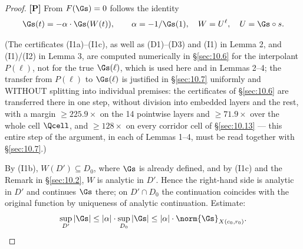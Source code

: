 \begin{proof}
\textbf{[P]} From $F(\Gs) = 0$ follows the identity
\[
\Gs(t) = -\alpha \cdot \Gs(W(t)) , \qquad \alpha = -1/\Gs(1), \quad W = U^\ell, \quad U = \Gs\circ s .
\]

(The certificates (I1a)--(I1c), as well as (D1)--(D3) and (I1) in Lemma 2, and
(I1)/(I2) in Lemma 3, are computed numerically in \S\ref{sec:10.6} for the
interpolant $P(\ell)$, not for the true $\Gs(\ell)$, which is used here and
in Lemmas 2--4; the transfer from $P(\ell)$ to $\Gs(\ell)$ is justified in
\S\ref{sec:10.7} uniformly and WITHOUT splitting into individual premises: the
certificates of \S\ref{sec:10.6} are transferred there in one step, without
division into embedded layers and the rest,
with a margin $\ge 225.9\times$ on the 14 pointwise layers
and $\ge 71.9\times$ over the whole cell $\Qcell$, and $\ge 128\times$ on every corridor cell
of \S\ref{sec:10.13} --- this entire step of the argument, in
each of Lemmas 1--4, must be read together with \S\ref{sec:10.7}.)

By (I1b), $W(D') \subseteq D_0$, where $\Gs$ is already defined, and by (I1c)
and the Remark in \S\ref{sec:10.2}, $W$ is analytic in $D'$. Hence the right-hand side
is analytic in $D'$ and continues $\Gs$ there; on $D' \cap D_0$ the
continuation coincides with the original function by uniqueness of
analytic continuation. Estimate:
\[
\sup_{D'} |\Gs| \le |\alpha| \cdot \sup_{D_0} |\Gs| \le |\alpha| \cdot \norm{\Gs}_{X(c_0,r_0)} .
\]


\end{proof}
